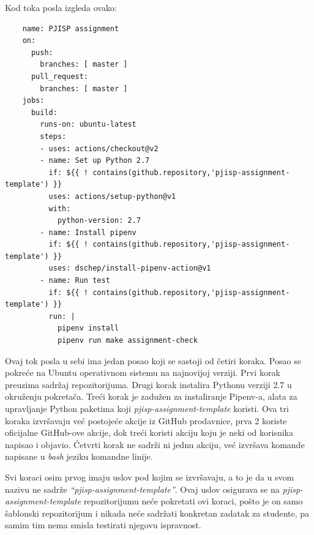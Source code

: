 \documentclass[12pt]{report}
\begin{document}
Kod toka posla izgleda ovako:

\begin{verbatim}
    name: PJISP assignment
    on:
      push:
        branches: [ master ]
      pull_request:
        branches: [ master ]
    jobs:
      build:
        runs-on: ubuntu-latest
        steps:
        - uses: actions/checkout@v2
        - name: Set up Python 2.7
          if: ${{ ! contains(github.repository,'pjisp-assignment-template') }}
          uses: actions/setup-python@v1
          with:
            python-version: 2.7
        - name: Install pipenv
          if: ${{ ! contains(github.repository,'pjisp-assignment-template') }}
          uses: dschep/install-pipenv-action@v1
        - name: Run test
          if: ${{ ! contains(github.repository,'pjisp-assignment-template') }}
          run: |
            pipenv install
            pipenv run make assignment-check
\end{verbatim}

Ovaj tok posla u sebi ima jedan posao koji se sastoji od četiri koraka. Posao se pokreće na Ubuntu operativnom sistemu na najnovijoj verziji. Prvi korak preuzima sadržaj repozitorijuma. Drugi korak instalira Pythonu verziji 2.7 u okruženju pokretača. Treći korak je zadužen za instaliranje Pipenv-a, alata za upravljanje Python paketima koji \textit{pjisp-assignment-template} koristi. Ova tri koraka izvršavaju već postojeće akcije iz GitHub prodavnice, prva 2 koriste oficijalne GitHub-ove akcije, dok treći koristi akciju koju je neki od korisnika napisao i objavio. Ćetvrti korak ne sadrži ni jednu akciju, već izvršava komande napisane u \textit{bash} jeziku komandne linije.

Svi koraci osim prvog imaju uslov pod kojim se izvršavaju, a to je da u svom nazivu ne sadrže \textit{``pjisp-assignment-template''}. Ovaj uslov osigurava se na \textit{pjisp-assignment-template} repozitorijumu neće pokretati ovi koraci, pošto je on samo šablonski repozitorijum i nikada neće sadržati konkretan zadatak za studente, pa samim tim nema smisla testirati njegovu ispravnost.
\end{document}
